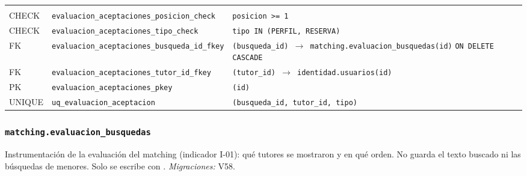{\small
\begin{xltabular}{\textwidth}{@{}>{\raggedright\arraybackslash}p{1.7cm} >{\raggedright\arraybackslash}p{4.6cm} L@{}}
    \toprule
     &  &  \\
    \midrule
    \endfirsthead
    \toprule
     &  &  \\
    \midrule
    \endhead
    \bottomrule
    \endfoot
    CHECK & \texttt{evaluacion\_\allowbreak{}aceptaciones\_\allowbreak{}posicion\_\allowbreak{}check} & \texttt{posicion \textgreater{}= 1} \\
    CHECK & \texttt{evaluacion\_\allowbreak{}aceptaciones\_\allowbreak{}tipo\_\allowbreak{}check} & \texttt{tipo IN (\allowbreak{}\textquotesingle{}PERFIL\textquotesingle{},\allowbreak{} \textquotesingle{}RESERVA\textquotesingle{})} \\
    FK & \texttt{evaluacion\_\allowbreak{}aceptaciones\_\allowbreak{}busqueda\_\allowbreak{}id\_\allowbreak{}fkey} & \texttt{(\allowbreak{}busqueda\_\allowbreak{}id) $\rightarrow$ matching.evaluacion\_\allowbreak{}busquedas(\allowbreak{}id)} \texttt{ON DELETE CASCADE} \\
    FK & \texttt{evaluacion\_\allowbreak{}aceptaciones\_\allowbreak{}tutor\_\allowbreak{}id\_\allowbreak{}fkey} & \texttt{(\allowbreak{}tutor\_\allowbreak{}id) $\rightarrow$ identidad.usuarios(\allowbreak{}id)} \\
    PK & \texttt{evaluacion\_\allowbreak{}aceptaciones\_\allowbreak{}pkey} & \texttt{(\allowbreak{}id)} \\
    UNIQUE & \texttt{uq\_\allowbreak{}evaluacion\_\allowbreak{}aceptacion} & \texttt{(\allowbreak{}busqueda\_\allowbreak{}id,\allowbreak{} tutor\_\allowbreak{}id,\allowbreak{} tipo)} \\
\end{xltabular}
}

\subsubsection{\texorpdfstring{\texttt{matching.evaluacion\_\allowbreak{}busquedas}}{matching.evaluacion\_busquedas}}\label{dd:matching.evaluacion_busquedas}

Instrumentación de la evaluación del \gls{matching} (indicador I-01): qué tutores se mostraron y en qué orden. No guarda el texto buscado ni las búsquedas de menores. Solo se escribe con . \emph{Migraciones:} V58.

